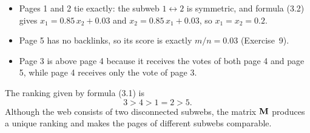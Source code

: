 \begin{itemize}
  \item Pages 1 and 2 tie exactly: the subweb $1 \leftrightarrow 2$ is symmetric, and formula (3.2) gives $x_1 = 0.85\,x_2 + 0.03$ and $x_2 = 0.85\,x_1 + 0.03$, so $x_1 = x_2 = 0.2$.
  \item Page 5 has no backlinks, so its score is exactly $m/n = 0.03$ (Exercise~9).
  \item Page 3 is above page 4 because it receives the votes of both page 4 and page 5, while page 4 receives only the vote of page 3.
\end{itemize}


The ranking given by formula (3.1) is
\[
  3 > 4 > 1 = 2 > 5 .
\]
Although the web consists of two disconnected subwebs, the matrix $\mathbf{M}$ produces a unique ranking and makes the pages of different subwebs comparable.
